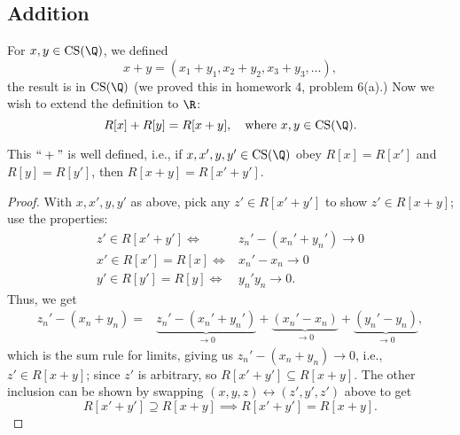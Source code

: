 \subsection{Addition}
For \(x,y\in\operatorname{CS}(\Q)\), we defined 
\begin{equation*}
	x+y=(x_1+y_1,x_2+y_2,x_3+y_3,\dots),
\end{equation*}
the result is in \(\operatorname{CS}(\Q)\) (we proved this in homework 4, problem 6(a).) Now we wish to extend the definition to \(\R\):
\begin{equation*}
	R[x]+R[y]=R[x+y],\quad\text{where}~x,y\in\operatorname{CS}(\Q).
\end{equation*}
\begin{proposition}
	This \(``+"\) is well defined, i.e., if \(x,x',y,y'\in\text{CS}(\Q)\) obey \(R[x]=R[x']\) and \(R[y]=R[y']\), then \(R[x+y]=R[x'+y']\).
\end{proposition}
\begin{proof}
	With \(x,x',y,y'\) as above, pick any \(z'\in R[x'+y']\) to show \(z'\in R[x+y]\); use the properties:
	\begin{align*}
		z'\in R[x'+y']\iff&z_n'-(x_n'+y_n')\to 0\\
		x'\in R[x']=R[x]\iff&x_n'-x_n\to 0\\
		y'\in R[y']=R[y]\iff&y_n'y_n\to 0.
	\end{align*}
	Thus, we get
	\begin{align*}
		z_n'-(x_n+y_n)=&\underbrace{z_n'-(x_n'+y_n')}_{\to 0}+\underbrace{(x_n'-x_n)}_{\to 0}+\underbrace{(y_n'-y_n)}_{\to 0},
	\end{align*}
	which is the sum rule for limits, giving us \(z_n'-(x_n+y_n)\to 0\), i.e., \(z'\in R[x+y]\); since \(z'\) is arbitrary, so \(R[x'+y']\subseteq R[x+y]\). The other inclusion can be shown by swapping \((x,y,z)\leftrightarrow(z',y',z')\) above to get
	\begin{equation*}
		R[x'+y']\supseteq R[x+y]\implies R[x'+y']=R[x+y].
	\end{equation*}
\end{proof}